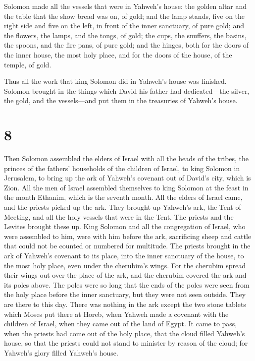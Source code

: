 Solomon made all the vessels that were in Yahweh's
house: the golden altar and the table that the show bread was on, of
gold;  and the lamp stands, five on the right side and
five on the left, in front of the inner sanctuary, of pure gold; and the
flowers, the lamps, and the tongs, of gold;  the cups,
the snuffers, the basins, the spoons, and the fire pans, of pure gold;
and the hinges, both for the doors of the inner house, the most holy
place, and for the doors of the house, of the temple, of gold.

 Thus all the work that king Solomon did in Yahweh's
house was finished. Solomon brought in the things which David his father
had dedicated---the silver, the gold, and the vessels---and put them in
the treasuries of Yahweh's house.

\hypertarget{section-7}{%
\section{8}\label{section-7}}

 Then Solomon assembled the elders of Israel with all the
heads of the tribes, the princes of the fathers' households of the
children of Israel, to king Solomon in Jerusalem, to bring up the ark of
Yahweh's covenant out of David's city, which is Zion.  All
the men of Israel assembled themselves to king Solomon at the feast in
the month Ethanim, which is the seventh month.  All the
elders of Israel came, and the priests picked up the ark. 
They brought up Yahweh's ark, the Tent of Meeting, and all the holy
vessels that were in the Tent. The priests and the Levites brought these
up.  King Solomon and all the congregation of Israel, who
were assembled to him, were with him before the ark, sacrificing sheep
and cattle that could not be counted or numbered for multitude.
 The priests brought in the ark of Yahweh's covenant to
its place, into the inner sanctuary of the house, to the most holy
place, even under the cherubim's wings.  For the cherubim
spread their wings out over the place of the ark, and the cherubim
covered the ark and its poles above.  The poles were so
long that the ends of the poles were seen from the holy place before the
inner sanctuary, but they were not seen outside. They are there to this
day.  There was nothing in the ark except the two stone
tablets which Moses put there at Horeb, when Yahweh made a covenant with
the children of Israel, when they came out of the land of Egypt.
 It came to pass, when the priests had come out of the
holy place, that the cloud filled Yahweh's house,  so
that the priests could not stand to minister by reason of the cloud; for
Yahweh's glory filled Yahweh's house.

